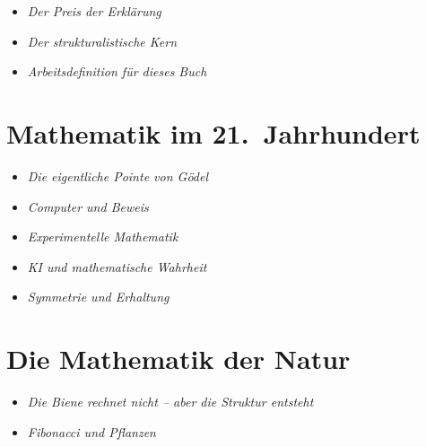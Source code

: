 \begin{NoteBox}[Hinweisboxen]
	
	\begin{itemize}
		\item \emph{Der Preis der Erklärung}\dotfill \pageref{box:kant-preis}
		\item \emph{Der strukturalistische Kern}\dotfill \pageref{box:strukturalistischer-kern}
		\item \emph{Arbeitsdefinition für dieses Buch}\dotfill \pageref{box:arbeitsdefinition}
	\end{itemize}
\end{NoteBox}

\section{Mathematik im 21.~Jahrhundert}

\begin{DidacticBox}[Didaktikboxen]
	\begin{itemize}
		\item \emph{Die eigentliche Pointe von Gödel}\dotfill \pageref{box:goedel-pointe}
		\item \emph{Computer und Beweis}\dotfill \pageref{box:computer-beweis}
		\item \emph{Experimentelle Mathematik}\dotfill \pageref{box:experimentelle-mathematik}
		\item \emph{KI und mathematische Wahrheit}\dotfill \pageref{box:ki-wahrheit}
		\item \emph{Symmetrie und Erhaltung}\dotfill \pageref{box:symmetrie-erhaltung}
	\end{itemize}
\end{DidacticBox}


\section{Die Mathematik der Natur}

\begin{NoteBox}[Hinweisboxen]
	
	\begin{itemize}
		\item \emph{Die Biene rechnet nicht -- aber die \newline Struktur entsteht}\dotfill \pageref{box:biene-struktur}
		\item \emph{Fibonacci und Pflanzen}\dotfill \pageref{box:fibonacci-pflanzen}
	\end{itemize}
\end{NoteBox}

